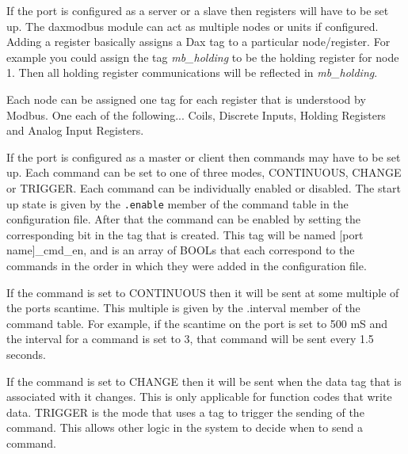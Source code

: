 If the port is configured as a server or a slave then registers will have to be set up.
The daxmodbus module can act as multiple nodes or units if configured.  Adding a register basically assigns a Dax tag to a particular node/register.  For example you
could assign the tag \textit{mb\_holding} to be the holding register for node 1.  Then all
holding register communications will be reflected in \textit{mb\_holding}.

Each node can be assigned one tag for each register that is understood by Modbus.  One each of the following... Coils, Discrete Inputs, Holding Registers and Analog Input Registers.

If the port is configured as a master or client then commands may have to be set up.  Each command can be set to one of three modes, CONTINUOUS, CHANGE or TRIGGER.  Each 
command can be individually enabled or disabled.  The start up state is given by the
\texttt{.enable} member of the command table in the configuration file.  After that the command
can be enabled by setting the corresponding bit in the tag that is created.  This tag
will be named [port name]\_cmd\_en, and is an array of BOOLs that each correspond to the
commands in the order in which they were added in the configuration file.

If the command is set to CONTINUOUS then it will be sent at some multiple of the ports
scantime.  This multiple is given by the .interval member of the command table.  For
example, if the scantime on the port is set to 500 mS and the interval for a command is set to 3, that command will be sent every 1.5 seconds.

If the command is set to CHANGE then it will be sent when the data tag that is associated with it changes.  This is only applicable for function codes that write data.
TRIGGER is the mode that uses a tag to trigger the sending of the command.  This allows
other logic in the system to decide when to send a command.

